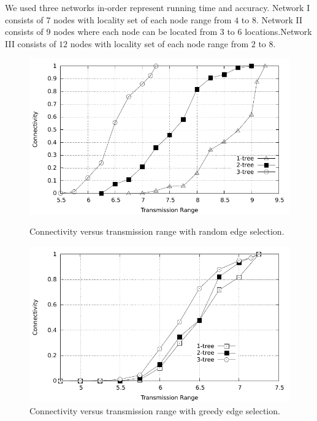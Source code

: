 \documentclass[12pt]{article}
\begin{document}
We used three networks in-order represent running time and accuracy. Network I consists of $7$ nodes with locality set of each node range from $4$ to $8$. Network II consists of $9$ nodes where each node can be located from $3$ to $6$ locations.Network III consists of $12$ nodes with locality set of each node range from $2$ to $8$.
\begin{figure}
\begin{minipage}[]{.5\linewidth}
\includegraphics[width=3 in, height=2.5 in]{random.pdf}
 \caption{ Connectivity versus transmission range with  random edge selection.
}
\label{fig:res}
\end{minipage}
\begin{minipage}{.5\linewidth}
\includegraphics[width=3 in, height=2.5 in]{Greedy.pdf}
 \caption{ Connectivity versus transmission range with greedy edge selection.
}
\label{fig:ges}
 \end{minipage}
\end{figure}
\end{document}

